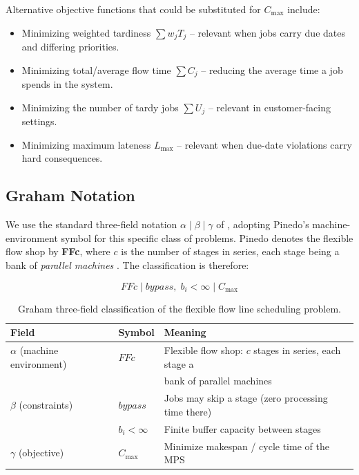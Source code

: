 \documentclass[11pt,a4paper]{article}
\begin{document}
Alternative objective functions that could be substituted for $C_{\max}$
include:

\begin{itemize}
  \item Minimizing weighted tardiness $\sum w_j T_j$ -- relevant when jobs
    carry due dates and differing priorities.
  \item Minimizing total/average flow time $\sum C_j$ -- reducing the
    average time a job spends in the system.
  \item Minimizing the number of tardy jobs $\sum U_j$ -- relevant in
    customer-facing settings.
  \item Minimizing maximum lateness $L_{\max}$ -- relevant when due-date
    violations carry hard consequences.
\end{itemize}

\subsection{Graham Notation}

We use the standard three-field notation $\alpha \mid \beta \mid \gamma$ of
\citet{graham1979optimization}, adopting Pinedo's machine-environment
symbol for this specific class of problems. Pinedo denotes the flexible
flow shop by \textbf{FFc}, where $c$ is the number of stages in series,
each stage being a bank of \emph{parallel machines}
\citep{pinedo2016scheduling}. The classification is therefore:

\begin{equation*}
  \boxed{\;FFc \mid bypass,\; b_i < \infty \mid C_{\max}\;}
\end{equation*}

\begin{table}[h!]
\centering
\begin{tabular}{@{}lll@{}}
\toprule
\textbf{Field} & \textbf{Symbol} & \textbf{Meaning} \\
\midrule
$\alpha$ (machine environment) & $FFc$ & Flexible flow shop: $c$ stages in
  series, each stage a \\
  & & bank of parallel machines \citep{pinedo2016scheduling} \\
$\beta$ (constraints) & $bypass$ & Jobs may skip a stage (zero processing
  time there) \\
 & $b_i < \infty$ & Finite buffer capacity between stages \\
$\gamma$ (objective) & $C_{\max}$ & Minimize makespan / cycle time of the
  MPS \\
\bottomrule
\end{tabular}
\caption{Graham three-field classification of the flexible flow line
  scheduling problem.}
\end{table}
\end{document}
